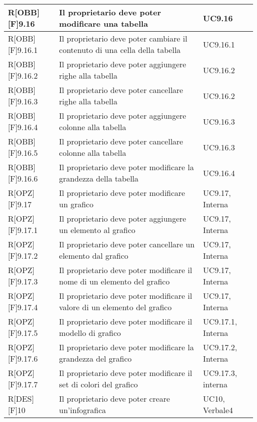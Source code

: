 	\newpage
	
	\begin{table}[h]
		\begin{tabular}{|p{}|p{}|p{}|}
			\midrule
			
R[OBB][F]9.16 & Il proprietario deve poter modificare una tabella & UC9.16 \\ \midrule
R[OBB][F]9.16.1 & Il proprietario deve poter cambiare il contenuto di una cella della tabella & UC9.16.1 \\ \midrule
R[OBB][F]9.16.2 & Il proprietario deve poter aggiungere righe alla tabella & UC9.16.2 \\ \midrule
R[OBB][F]9.16.3 & Il proprietario deve poter cancellare righe alla tabella & UC9.16.2 \\ \midrule
R[OBB][F]9.16.4 & Il proprietario deve poter aggiungere colonne alla tabella & UC9.16.3 \\ \midrule
R[OBB][F]9.16.5 & Il proprietario deve poter cancellare colonne alla tabella & UC9.16.3 \\ \midrule
R[OBB][F]9.16.6 & Il proprietario deve poter modificare la grandezza della tabella & UC9.16.4 \\ \midrule
R[OPZ][F]9.17 & Il proprietario deve poter modificare un grafico & UC9.17, Interna \\ \midrule
R[OPZ][F]9.17.1 & Il proprietario deve poter aggiungere un elemento al grafico & UC9.17, Interna \\ \midrule
R[OPZ][F]9.17.2 & Il proprietario deve poter cancellare un elemento dal grafico & UC9.17, Interna \\ \midrule
R[OPZ][F]9.17.3 & Il proprietario deve poter modificare il nome di un elemento del grafico & UC9.17, Interna \\ \midrule
R[OPZ][F]9.17.4 & Il proprietario deve poter modificare il valore di un elemento del grafico & UC9.17, Interna \\ \midrule
R[OPZ][F]9.17.5 & Il proprietario deve poter modificare il modello di grafico & UC9.17.1, Interna \\ \midrule
R[OPZ][F]9.17.6 & Il proprietario deve poter modificare la grandezza del grafico & UC9.17.2, Interna \\ \midrule
R[OPZ][F]9.17.7 & Il proprietario deve poter modificare il set di colori del grafico & UC9.17.3, interna \\ \midrule
R[DES][F]10 & Il proprietario deve poter creare un'\gls{infografica} & UC10, Verbale4 \\ \midrule

\end{tabular}
\end{table}
